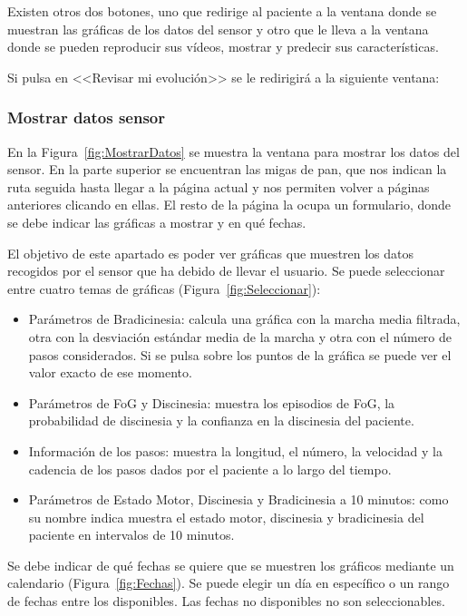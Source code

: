     Existen otros dos botones, uno que redirige al paciente a la ventana donde se muestran las gráficas de los datos del sensor y otro que le lleva a la ventana donde se pueden reproducir sus vídeos, mostrar y predecir sus características.

    Si pulsa en <<Revisar mi evolución>> se le redirigirá a la siguiente ventana:
    
    \subsubsection{Mostrar datos sensor}
    En la Figura~\ref{fig:MostrarDatos} se muestra la ventana para mostrar los datos del sensor. En la parte superior se encuentran las migas de pan, que nos indican la ruta seguida hasta llegar a la página actual y nos permiten volver a páginas anteriores clicando en ellas. El resto de la página la ocupa un formulario, donde se debe indicar las gráficas a mostrar y en qué fechas.
    
    El objetivo de este apartado es poder ver gráficas que muestren los datos recogidos por el sensor que ha debido de llevar el usuario. Se puede seleccionar entre cuatro temas de gráficas (Figura~\ref{fig:Seleccionar}):
    \begin{itemize}
        \item Parámetros de Bradicinesia: calcula una gráfica con la marcha media filtrada, otra con la desviación estándar media de la marcha y otra con el número de pasos considerados. Si se pulsa sobre los puntos de la gráfica se puede ver el valor exacto de ese momento.
        \item Parámetros de FoG y Discinesia: muestra los episodios de FoG, la probabilidad de discinesia y la confianza en la discinesia del paciente.
        \item Información de los pasos: muestra la longitud, el número, la velocidad y la cadencia de los pasos dados por el paciente a lo largo del tiempo.
        \item Parámetros de Estado Motor, Discinesia y Bradicinesia a 10 minutos: como su nombre indica muestra el estado motor, discinesia y bradicinesia del paciente en intervalos de 10 minutos.
     \end{itemize}

    Se debe indicar de qué fechas se quiere que se muestren los gráficos mediante un calendario (Figura~\ref{fig:Fechas}). Se puede elegir un día en específico o un rango de fechas entre los disponibles. Las fechas no disponibles no son seleccionables.

